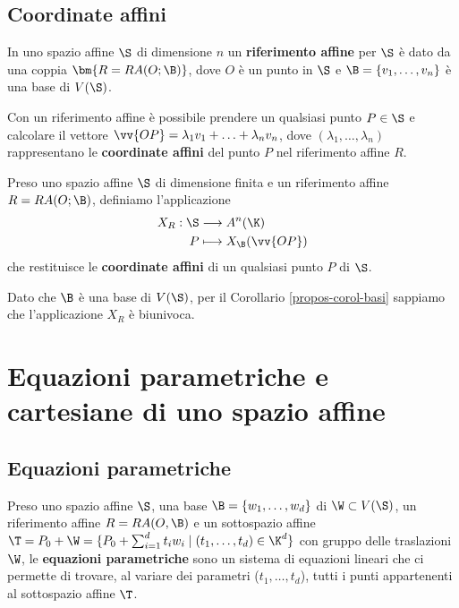 \documentclass[11pt, a4paper, titlepage, oneside]{scrbook}
\begin{document}
\subsection{Coordinate affini}
\begin{Definizione}
\label{def-riferimento-affine}
In uno spazio affine $\S$ di dimensione $n$ un \textbf{riferimento affine} per $\S$ è dato da una coppia $\bm{R = RA(O;\B)}$, dove $O$ è un punto in $\S$ e $\B = \{v_1, \ldots, v_n\}$ è una base di $V(\S)$.
\end{Definizione}

Con un riferimento affine è possibile prendere un qualsiasi punto $P \in \S$ e calcolare il vettore $\vv{OP} = \lambda_1 v_1 + \ldots + \lambda_n v_n$, dove $(\lambda_1, \ldots, \lambda_n)$ rappresentano le \textbf{coordinate affini} del punto $P$ nel riferimento affine $R$.

\begin{Definizione}
\label{def-coordinate-affini}
Preso uno spazio affine $\S$ di dimensione finita e un riferimento affine $R = RA(O; \B)$, definiamo l'applicazione
\begin{align*}
X_R: \S &\longrightarrow A^n(\K)  \\
 P &\longmapsto X_\B(\vv{OP}) 
\end{align*}
che restituisce le \textbf{coordinate affini} di un qualsiasi punto $P$ di $\S$.

\NB Dato che $\B$ è una base di $V(\S)$, per il Corollario \ref{propos-corol-basi} sappiamo che l'applicazione $X_R$ è biunivoca.
\end{Definizione}

\section{Equazioni parametriche e cartesiane di uno spazio affine}
\subsection{Equazioni parametriche}

\begin{Definizione}
\label{def-equazioni-parametriche}
Preso uno spazio affine $\S$, una base $\B = \{w_1, \ldots, w_d\}$ di $\W \subset V(\S)$, un riferimento affine $R = RA(O,\B)$ e un sottospazio affine $\T = P_0 + \W = \{P_0 + \sum_{i = 1}^d t_i w_i \mid (t_1, \ldots, t_d) \in \K^d\}$ con gruppo delle traslazioni $\W$, le \textbf{equazioni parametriche} sono un sistema di equazioni lineari che ci permette di trovare, al variare dei parametri ($t_1, \ldots, t_d$), tutti i punti appartenenti al sottospazio affine $\T$.
\end{Definizione}
\end{document}
